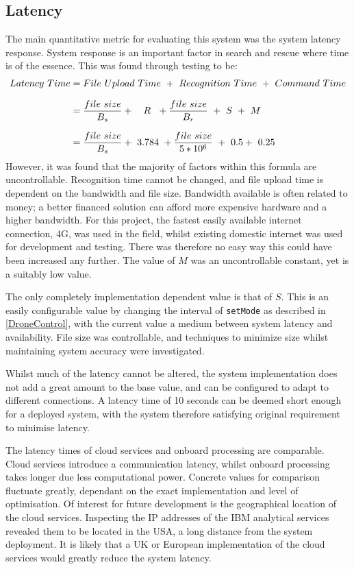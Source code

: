 \documentclass{article}
\begin{document}
\subsection{Latency}
The main quantitative metric for evaluating this system was the system latency response. System response is an important factor in search and rescue where time is of the essence. This was found through testing to be:
\begin{equation*}
\setlength{\jot}{10pt}
\begin{split}
Latency\ Time 	&= File\ Upload\ Time\ +\ Recognition\ Time\ +\ Command\ Time \\
				&= \frac{file\ size}{B_s} +\ \ \ R\ \ + \frac{file\ size}{B_r}\ +\ S\  +\ M \\
				&= \frac{file\ size}{B_s} +\ 3.784\ + \frac{file\ size}{5*10^6}\ +\ 0.5 +\ 0.25 
\end{split}
\end{equation*}
However, it was found that the majority of factors within this formula are uncontrollable. Recognition time cannot be changed, and file upload time is dependent on the bandwidth and file size. Bandwidth available is often related to money; a better financed solution can afford more expensive hardware and a higher bandwidth. For this project, the fastest easily available internet connection, 4G, was used in the field, whilst existing domestic internet was used for development and testing. There was therefore no easy way this could have been increased any further. The value of $M$ was an uncontrollable constant, yet is a suitably low value. 

The only completely implementation dependent value is that of $S$. This is an easily configurable value by changing the interval of \texttt{setMode} as described in \ref{DroneControl}, with the current value a medium between system latency and availability. File size was controllable, and techniques to minimize size whilst maintaining system accuracy were investigated. 

Whilst much of the latency cannot be altered, the system implementation does not add a great amount to the base value, and can be configured to adapt to different connections. A latency time of 10 seconds can be deemed short enough for a deployed system, with the system therefore satisfying original requirement to minimise latency. 

The latency times of cloud services and onboard processing are comparable. Cloud services introduce a communication latency, whilst onboard processing takes longer due less computational power. Concrete values for comparison fluctuate greatly, dependant on the exact implementation and level of optimisation. Of interest for future development is the geographical location of the cloud services. Inspecting the IP addresses of the IBM analytical services revealed them to be located in the USA, a long distance from the system deployment. It is likely that a UK or European implementation of the cloud services would greatly reduce the system latency.
\end{document}

